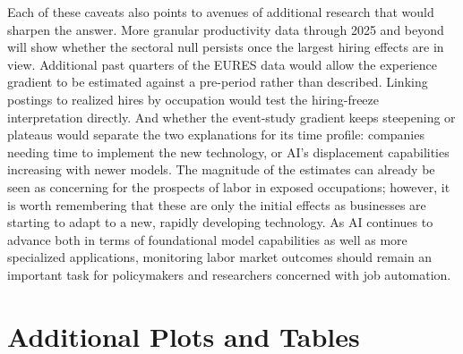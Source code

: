 \documentclass[11pt]{article}
\begin{document}
Each of these caveats also points to avenues of additional research that would sharpen the answer. More granular productivity data through 2025 and beyond will show whether the sectoral null persists once the largest hiring effects are in view. Additional past quarters of the EURES data would allow the experience gradient to be estimated against a pre-period rather than described. Linking postings to realized hires by occupation would test the hiring-freeze interpretation directly. And whether the event-study gradient keeps steepening or plateaus would separate the two explanations for its time profile: companies needing time to implement the new technology, or AI's displacement capabilities increasing with newer models. The magnitude of the estimates can already be seen as concerning for the prospects of labor in exposed occupations; however, it is worth remembering that these are only the initial effects as businesses are starting to adapt to a new, rapidly developing technology. As AI continues to advance both in terms of foundational model capabilities as well as more specialized applications, monitoring labor market outcomes should remain an important task for policymakers and researchers concerned with job automation.

\clearpage


\clearpage
\appendix
\section{Additional Plots and Tables}
\end{document}
